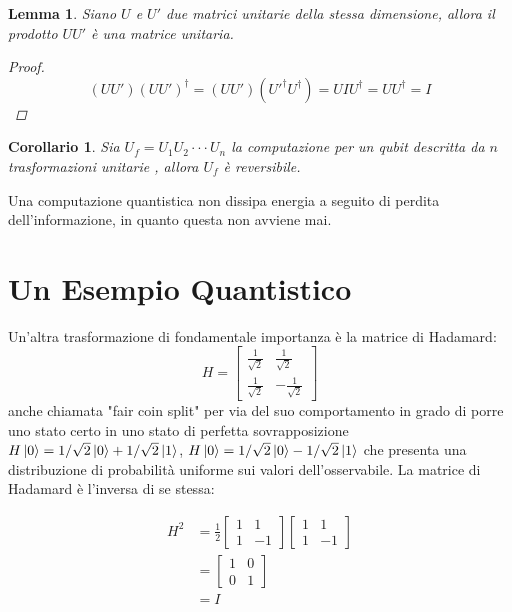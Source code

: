 \documentclass[12pt,a4paper,openright]{report}
\newtheorem{mylem}{Lemma}
\newtheorem*{mycor}{Corollario}
\begin{document}
\begin{mylem}
    Siano $U$ e $U'$ due matrici unitarie della stessa dimensione, allora il prodotto $UU'$ è una matrice unitaria.
    \begin{proof}
        \[
            (UU')(UU')^{\dag}=(UU')({U'}^{\dag}{U}^{\dag}) = UIU^{\dag} = UU^{\dag} = I
        \]
    \end{proof}
\end{mylem} 
\begin{mycor}
    Sia $U_f=U_1U_2 \cdot\cdot\cdot U_n$ la computazione per un qubit descritta da $n$ trasformazioni unitarie , allora $U_f$ è reversibile. 
\end{mycor}
Una computazione quantistica non dissipa energia a seguito di perdita dell'informazione, in quanto questa non avviene mai. 
\section{Un Esempio Quantistico}

Un'altra trasformazione di fondamentale importanza è la matrice di Hadamard:
\[
    H=\begin{bmatrix}
        \frac{1}{\sqrt2} & \frac{1}{\sqrt2} \\
        \frac{1}{\sqrt2} & -\frac{1}{\sqrt2} 
    \end{bmatrix}
\] 
anche chiamata "fair coin split" per via del suo comportamento in grado di porre uno stato certo in uno stato di perfetta sovrapposizione 
$H\ket0 = 1/\sqrt2\ket0 + 1/\sqrt2\ket1$, $H\ket0 = 1/\sqrt2\ket0 - 1/\sqrt2\ket1$ che presenta una distribuzione di probabilità uniforme
sui valori dell'osservabile.
La matrice di Hadamard è l'inversa di se stessa:
\begin{center}
    \begin{align*}
        H^2 &= \frac{1}{2}\begin{bmatrix}
            1 & 1 \\
            1 & -1 
        \end{bmatrix}\begin{bmatrix}
            1 & 1 \\
            1 & -1 
        \end{bmatrix}\\
        &= \begin{bmatrix}
            1 & 0\\
            0 & 1
        \end{bmatrix}\\ 
        &= I
    \end{align*}
\end{center}
 
\end{document}
